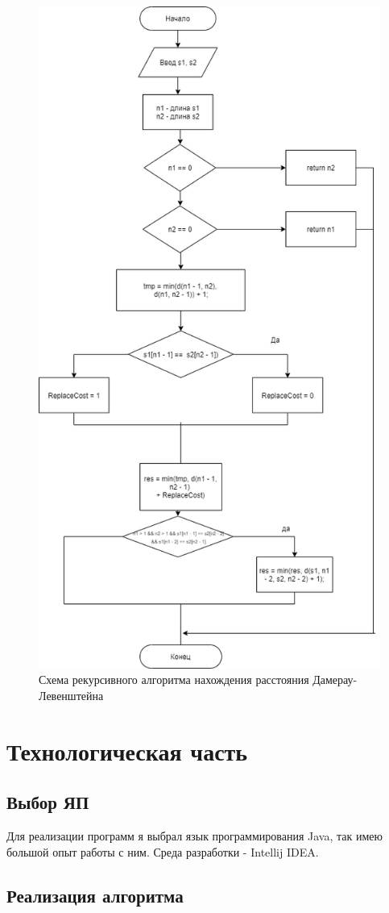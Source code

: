 \documentclass[12pt]{report}
\begin{document}
\begin{figure}[h]
\centering
\includegraphics[width=0.75\linewidth]{RecDL.png}
\caption{Схема рекурсивного алгоритма нахождения расстояния Дамерау-Левенштейна}
\label{fig:mpr}
\end{figure}


\chapter{Технологическая часть}
\section{Выбор ЯП}
Для реализации программ я выбрал язык программирования Java, так имею большой опыт работы с ним. Среда разработки - Intellij IDEA.

\section{Реализация алгоритма}
\end{document}
